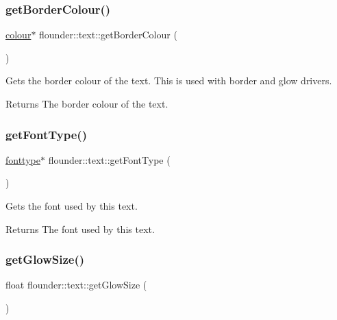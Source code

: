 \subsubsection{\texorpdfstring{get\+Border\+Colour()}{getBorderColour()}}
{\footnotesize\ttfamily \hyperlink{classflounder_1_1colour}{colour}$\ast$ flounder\+::text\+::get\+Border\+Colour (\begin{DoxyParamCaption}{ }\end{DoxyParamCaption})\hspace{0.3cm}{\ttfamily [inline]}}



Gets the border colour of the text. This is used with border and glow drivers. 

\begin{DoxyReturn}{Returns}
The border colour of the text. 
\end{DoxyReturn}
\mbox{\label{classflounder_1_1text_aeed1638cf36d796822e56370a9f6278b}} 
\subsubsection{\texorpdfstring{get\+Font\+Type()}{getFontType()}}
{\footnotesize\ttfamily \hyperlink{classflounder_1_1fonttype}{fonttype}$\ast$ flounder\+::text\+::get\+Font\+Type (\begin{DoxyParamCaption}{ }\end{DoxyParamCaption})\hspace{0.3cm}{\ttfamily [inline]}}



Gets the font used by this text. 

\begin{DoxyReturn}{Returns}
The font used by this text. 
\end{DoxyReturn}
\mbox{\label{classflounder_1_1text_ad4c9fe99e6285ba919a21cebb278472b}} 
\subsubsection{\texorpdfstring{get\+Glow\+Size()}{getGlowSize()}}
{\footnotesize\ttfamily float flounder\+::text\+::get\+Glow\+Size (\begin{DoxyParamCaption}{ }\end{DoxyParamCaption})}



